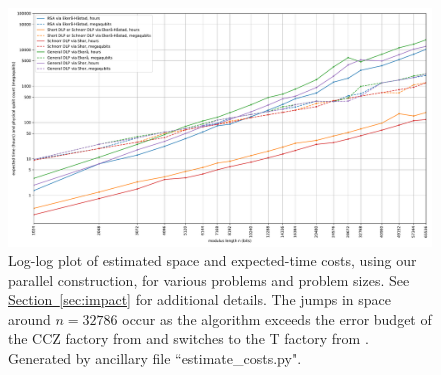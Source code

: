\documentclass[superscriptaddress,notitlepage,longbibliography]{revtex4-1}
\theoremstyle{definition}
\theoremstyle{definition}
\renewcommand{\sec}[1]{\hyperref[sec:#1]{Section~\ref*{sec:#1}}}
\begin{document}
\begin{figure}[p]
    \begin{center}
    \includegraphics[width=1.0\textwidth]{assets/rsa-dlps-extras.pdf}
    \end{center}
    \caption{
    Log-log plot of estimated space and expected-time costs, using our parallel construction, for various problems and problem sizes.
    See \sec{impact} for additional details.
    The jumps in space around $n=32786$ occur as the algorithm exceeds the error budget of the CCZ factory from \cite{gidney2018magic} and switches to the T factory from \cite{fowler2018}.
    Generated by ancillary file ``estimate\_costs.py".
    }
    \label{fig:plot-costs}
\end{figure}
\end{document}

